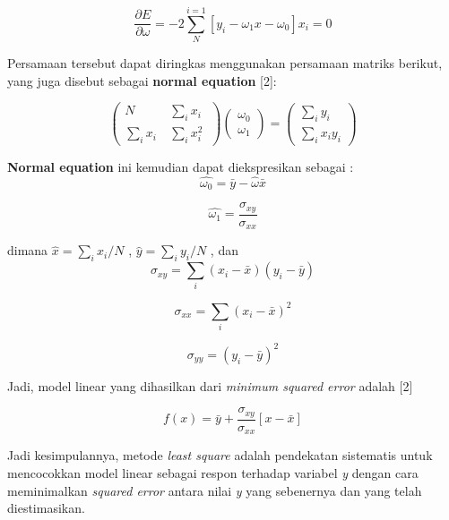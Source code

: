 \documentclass[12pt]{article}%
\begin{document}
\begin{enumerate}
	\begin{equation}
		 \frac{\partial \textit{E}}{\partial \omega } = -2 \sum_{N}^{i=1} \left [ y_i - \omega_1x - \omega_0 \right ] x_i = 0
	\end{equation}

	\par Persamaan tersebut dapat diringkas menggunakan persamaan matriks berikut, yang juga disebut sebagai \textbf{normal equation} [2]:

	\[\begin{pmatrix} N & \sum _i x_i\\ \sum _i x_i\ & \sum _i x^2_i\ \end{pmatrix} \begin{pmatrix} \omega_0\\ \omega_1 \end{pmatrix} = \begin{pmatrix} \sum_i y_i\\ \sum_i x_i y_i \end{pmatrix}\]


	\par \textbf{Normal equation} ini kemudian dapat diekspresikan sebagai :
	\begin{equation}
		\hat{\omega_0 }=  \bar{y} - \hat{\omega}\bar{x}
	\end{equation}

	\begin{equation}
		\hat{\omega_1} = \frac{\sigma_{xy}}{\sigma_{xx}} 
	\end{equation}

	\par dimana $\hat{x}=\sum_i x_i / N$ , $\hat{y} = \sum_i y_i / N$ , dan 
		\[\sigma_{xy} = \sum_i (x_i - \bar{x})(y_i - \bar{y})\]

		\[\sigma_{xx} = \sum_i (x_i - \bar{x})^2\]

		\[\sigma_{yy} = (y_i - \bar{y})^2\]
 
 	\par Jadi, model linear yang dihasilkan dari \textit{minimum squared error} adalah [2]

 		\[f(x) = \bar{y} + \frac{\sigma_{xy}}{\sigma_{xx}}\left [ x - \bar{x} \right ]\]

 	\par Jadi kesimpulannya, metode \textit{least square} adalah pendekatan sistematis untuk mencocokkan model linear sebagai respon terhadap variabel \textit{y} dengan cara meminimalkan \textit{squared error} antara nilai \textit{y} yang sebenernya dan yang telah diestimasikan.


\end{enumerate}
\end{document}
